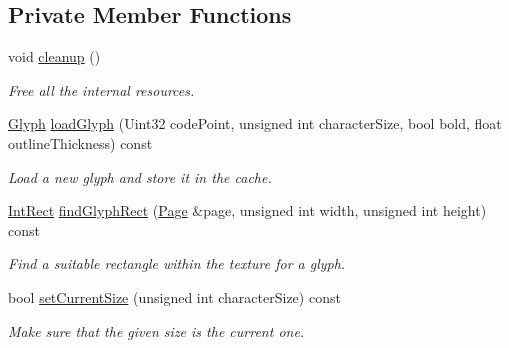 \subsection*{Private Member Functions}
\begin{DoxyCompactItemize}
\item 
void \mbox{\hyperlink{classsf_1_1_font_aa730fde783fa25a369941a12ae9d1e8e}{cleanup}} ()
\begin{DoxyCompactList}\small\item\em Free all the internal resources. \end{DoxyCompactList}\item 
\mbox{\hyperlink{classsf_1_1_glyph}{Glyph}} \mbox{\hyperlink{classsf_1_1_font_aa85d44ca0c95b5826cb4adf96a5076ba}{load\+Glyph}} (Uint32 code\+Point, unsigned int character\+Size, bool bold, float outline\+Thickness) const
\begin{DoxyCompactList}\small\item\em Load a new glyph and store it in the cache. \end{DoxyCompactList}\item 
\mbox{\hyperlink{classsf_1_1_rect}{Int\+Rect}} \mbox{\hyperlink{classsf_1_1_font_a9201f9699d7c2c22975fa405465aa933}{find\+Glyph\+Rect}} (\mbox{\hyperlink{structsf_1_1_font_1_1_page}{Page}} \&page, unsigned int width, unsigned int height) const
\begin{DoxyCompactList}\small\item\em Find a suitable rectangle within the texture for a glyph. \end{DoxyCompactList}\item 
bool \mbox{\hyperlink{classsf_1_1_font_ad1fb7470094a4298932dde878a0ad1c3}{set\+Current\+Size}} (unsigned int character\+Size) const
\begin{DoxyCompactList}\small\item\em Make sure that the given size is the current one. \end{DoxyCompactList}\end{DoxyCompactItemize}
